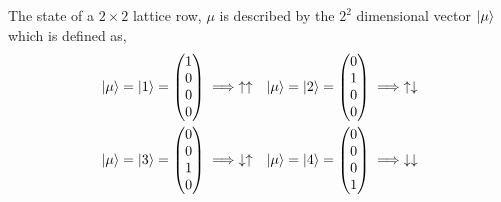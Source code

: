 \documentclass[titlepage, a4paper, 11pt]{article}
\newcommand\mtx[1]{\begin{pmatrix} #1 \end{pmatrix}}
\begin{document}
The state of a $2 \times 2$ lattice row, $\mu$ is described by the $2^2$ dimensional vector
$\ket{\mu}$ which is defined as,
\begin{align*}
	\ket{\mu} = \ket{1} = \mtx{1\\0\\0\\0} \implies \uparrow \uparrow
	&&\ket{\mu} = \ket{2} = \mtx{0\\1\\0\\0} \implies \uparrow \downarrow \\
	\ket{\mu} = \ket{3} = \mtx{0\\0\\1\\0} \implies \downarrow \uparrow
	&&\ket{\mu} = \ket{4} = \mtx{0\\0\\0\\1} \implies \downarrow \downarrow
\end{align*}
\end{document}
